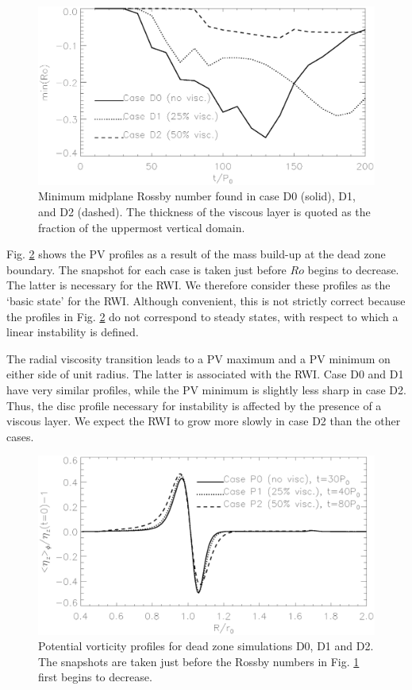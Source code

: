 \begin{figure}
  \centering
  \includegraphics[width=\linewidth]{figures/rtrans_nuamp10_minrossby}
  \caption{Minimum midplane Rossby number found in case D0 (solid),
    D1, and D2 (dashed). The thickness of the viscous layer is quoted
    as the fraction of the uppermost vertical domain. 
    \label{rtrans_nuamp10_minrossby}}
\end{figure}

Fig. \ref{rtrans_nuamp10_vorten1d} shows the PV profiles as a result
of the mass build-up at the dead zone boundary. The snapshot for each
case is taken just before $Ro$ begins to decrease. 
The latter is necessary for the RWI. We
therefore consider these profiles as the `basic state' for the
RWI. Although convenient, this is not strictly correct because the
profiles in Fig. \ref{rtrans_nuamp10_vorten1d} do not correspond to
steady states, with respect to which a linear instability is defined.   

The radial viscosity transition leads to a PV maximum and a PV minimum
on either side of unit radius. The latter is associated with the RWI. 
Case D0 and D1 have very similar profiles, while the PV minimum is
slightly less sharp in case D2. Thus, the disc profile necessary for
instability is affected by the presence of a viscous layer. We expect
the RWI to grow more slowly in case D2 than the other cases. 

\begin{figure}
  \centering
  \includegraphics[width=\linewidth]{figures/rtrans_nuamp10_vorten1d}
  \caption{Potential vorticity profiles for dead zone simulations D0,
    D1 and D2. The snapshots are taken just before the Rossby numbers
    in Fig. \ref{rtrans_nuamp10_minrossby} first begins to decrease. 
    \label{rtrans_nuamp10_vorten1d}}
\end{figure}


